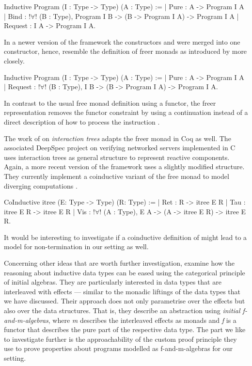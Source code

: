 \begin{coqcode}
Inductive Program (I : Type -> Type) (A : Type) :=
| Pure    : A -> Program I A
| Bind    : !$\forall$! (B : Type), Program I B -> (B -> Program I A) -> Program I A
| Request : I A -> Program I A.
\end{coqcode}

In a newer version of the framework the constructors  and  were merged into one constructor, hence, resemble the definition of freer monads as introduced by \citet{kiselyov2015freer} more closely.

\begin{coqcode}
Inductive Program (I : Type -> Type) (A : Type) :=
| Pure    : A -> Program I A
| Request : !$\forall$! (B : Type), I B -> (B -> Program I A) -> Program I A.
\end{coqcode}

In contrast to the usual free monad definition using a functor, the freer representation removes the functor constraint by using a continuation  instead of a direct description of how to process the instruction .

The work of \citet{koh2019interaction} on \emph{interaction trees} adapts the freer monad in Coq as well.
The associated DeepSpec project on verifying networked servers implemented in C uses interaction trees as general structure to represent reactive components.
Again,  a more recent version of the framework uses a slightly modified structure.
They currently implement a coinductive variant of the free monad to model diverging computations \citep{xia2019interaction}.

\begin{coqcode}
CoInductive itree (E: Type -> Type) (R: Type) :=
| Ret  : R -> itree E R
| Tau : itree E R -> itree E R
| Vis : !$\forall$! (A : Type), E A -> (A -> itree E R) -> itree E R.
\end{coqcode}

It would be interesting to investigate if a coinductive definition of  might lead to a model for non\--termination in our setting as well.

Concerning other ideas that are worth further investigation, \citet{atkey2015interleaving} examine how the reasoning about
inductive data types can be eased using the categorical principle of initial algebras.
They are particularly interested in data types that are interleaved with effects --- similar to the monadic liftings of the data types that we have discussed.
Their approach does not only parametrise over the effects but also over the data structures.
That is, they describe an abstraction using \emph{initial f\--and\--m\--algebras}, where \emph{m} describes the interleaved effects as monads and \emph{f} is a functor that describes the pure part of the respective data type.
The part we like to investigate further is the approachability of the custom proof principle they use to prove properties about programs modelled as f\--and\--m\--algebras for our setting.

